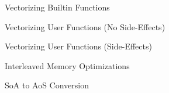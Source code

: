 
\begin{frame}{Vectorizing Builtin Functions}


\end{frame}


\begin{frame}{Vectorizing User Functions (No Side-Effects)}


\end{frame}


\begin{frame}{Vectorizing User Functions (Side-Effects)}


\end{frame}


\begin{frame}{Interleaved Memory Optimizations}

\end{frame}


\begin{frame}{SoA to AoS Conversion}

\end{frame}
